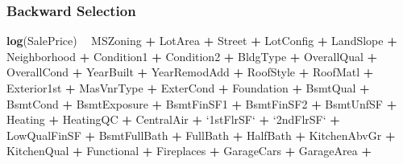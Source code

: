 \documentclass[american,]{article}
\newenvironment{Shaded}{\begin{snugshade}}{\end{snugshade}}
\newcommand{\DataTypeTok}[1]{\textcolor[rgb]{0.13,0.29,0.53}{#1}}
\newcommand{\KeywordTok}[1]{\textcolor[rgb]{0.13,0.29,0.53}{\textbf{#1}}}
\newcommand{\NormalTok}[1]{#1}
\newcommand{\OperatorTok}[1]{\textcolor[rgb]{0.81,0.36,0.00}{\textbf{#1}}}
\newcommand{\StringTok}[1]{\textcolor[rgb]{0.31,0.60,0.02}{#1}}
\begin{document}
\hypertarget{backward-selection}{%
\subsubsection{Backward Selection}\label{backward-selection}}

\label{appendix:backSelection}

\begin{Shaded}
\begin{Highlighting}[]
\KeywordTok{log}\NormalTok{(SalePrice) }\OperatorTok{~}\StringTok{ }
\StringTok{           }\NormalTok{MSZoning }\OperatorTok{+}\StringTok{ }\NormalTok{LotArea }\OperatorTok{+}\StringTok{ }\NormalTok{Street }\OperatorTok{+}\StringTok{ }\NormalTok{LotConfig }\OperatorTok{+}\StringTok{ }\NormalTok{LandSlope }\OperatorTok{+}
\StringTok{           }\NormalTok{Neighborhood }\OperatorTok{+}\StringTok{ }\NormalTok{Condition1 }\OperatorTok{+}\StringTok{ }\NormalTok{Condition2 }\OperatorTok{+}\StringTok{ }\NormalTok{BldgType }\OperatorTok{+}\StringTok{ }\NormalTok{OverallQual }\OperatorTok{+}
\StringTok{           }\NormalTok{OverallCond }\OperatorTok{+}\StringTok{ }\NormalTok{YearBuilt }\OperatorTok{+}\StringTok{ }\NormalTok{YearRemodAdd }\OperatorTok{+}\StringTok{ }\NormalTok{RoofStyle }\OperatorTok{+}\StringTok{ }\NormalTok{RoofMatl }\OperatorTok{+}
\StringTok{           }\NormalTok{Exterior1st }\OperatorTok{+}\StringTok{ }\NormalTok{MasVnrType }\OperatorTok{+}\StringTok{ }\NormalTok{ExterCond }\OperatorTok{+}\StringTok{ }\NormalTok{Foundation }\OperatorTok{+}\StringTok{ }\NormalTok{BsmtQual }\OperatorTok{+}
\StringTok{           }\NormalTok{BsmtCond }\OperatorTok{+}\StringTok{ }\NormalTok{BsmtExposure }\OperatorTok{+}\StringTok{ }\NormalTok{BsmtFinSF1 }\OperatorTok{+}\StringTok{ }\NormalTok{BsmtFinSF2 }\OperatorTok{+}\StringTok{ }\NormalTok{BsmtUnfSF }\OperatorTok{+}
\StringTok{           }\NormalTok{Heating }\OperatorTok{+}\StringTok{ }\NormalTok{HeatingQC }\OperatorTok{+}\StringTok{ }\NormalTok{CentralAir }\OperatorTok{+}\StringTok{ `}\DataTypeTok{1stFlrSF}\StringTok{`} \OperatorTok{+}\StringTok{ `}\DataTypeTok{2ndFlrSF}\StringTok{`} \OperatorTok{+}
\StringTok{           }\NormalTok{LowQualFinSF }\OperatorTok{+}\StringTok{ }\NormalTok{BsmtFullBath }\OperatorTok{+}\StringTok{ }\NormalTok{FullBath }\OperatorTok{+}\StringTok{ }\NormalTok{HalfBath }\OperatorTok{+}\StringTok{ }\NormalTok{KitchenAbvGr }\OperatorTok{+}
\StringTok{           }\NormalTok{KitchenQual }\OperatorTok{+}\StringTok{ }\NormalTok{Functional }\OperatorTok{+}\StringTok{ }\NormalTok{Fireplaces }\OperatorTok{+}\StringTok{ }\NormalTok{GarageCars }\OperatorTok{+}\StringTok{ }\NormalTok{GarageArea }\OperatorTok{+}

\end{Highlighting}
\end{Shaded}
\end{document}
